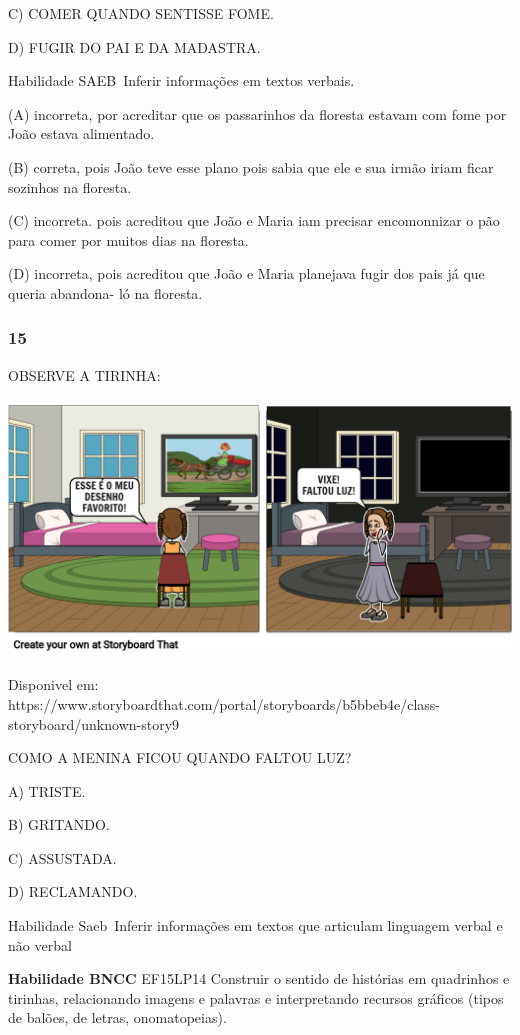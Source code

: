 C) COMER QUANDO SENTISSE FOME.

D) FUGIR DO PAI E DA MADASTRA.

Habilidade SAEB~Inferir informações em textos verbais.

(A) incorreta, por acreditar que os passarinhos da floresta estavam com
fome por João estava alimentado.

(B) correta, pois João teve esse plano pois sabia que ele e sua irmão
iriam ficar sozinhos na floresta.

(C) incorreta. pois acreditou que João e Maria iam precisar encomonnizar
o pão para comer por muitos dias na floresta.

(D) incorreta, pois acreditou que João e Maria planejava fugir dos pais
já que queria abandona- ló na floresta.

\subsubsection{15}\label{section-40}

OBSERVE A TIRINHA:

\includegraphics[width=5.42742in,height=2.68116in]{media/image206.png}

Disponivel em:
https://www.storyboardthat.com/portal/storyboards/b5bbeb4e/class-storyboard/unknown-story9

COMO A MENINA FICOU QUANDO FALTOU LUZ?

A) TRISTE.

B) GRITANDO.

C) ASSUSTADA.

D) RECLAMANDO.

Habilidade Saeb~Inferir informações em textos que articulam linguagem
verbal e não verbal

\textbf{Habilidade BNCC} EF15LP14 Construir o sentido de histórias em
quadrinhos e tirinhas, relacionando imagens e palavras e interpretando
recursos gráficos (tipos de balões, de letras, onomatopeias).

